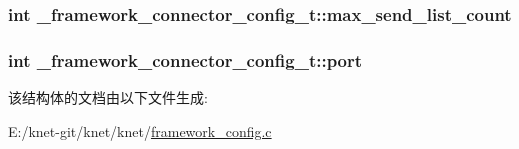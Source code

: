 \subsubsection[{max\+\_\+send\+\_\+list\+\_\+count}]{\setlength{\rightskip}{0pt plus 5cm}int \+\_\+framework\+\_\+connector\+\_\+config\+\_\+t\+::max\+\_\+send\+\_\+list\+\_\+count}\label{a00011_ac6e964a4a4ca24a176016275955a4e05_ac6e964a4a4ca24a176016275955a4e05}
\hypertarget{a00011_a5427527be42630baf3fc0497e74e4d4d_a5427527be42630baf3fc0497e74e4d4d}{}
\subsubsection[{port}]{\setlength{\rightskip}{0pt plus 5cm}int \+\_\+framework\+\_\+connector\+\_\+config\+\_\+t\+::port}\label{a00011_a5427527be42630baf3fc0497e74e4d4d_a5427527be42630baf3fc0497e74e4d4d}


该结构体的文档由以下文件生成\+:\begin{DoxyCompactItemize}
\item 
E\+:/knet-\/git/knet/knet/\hyperlink{a00055}{framework\+\_\+config.\+c}\end{DoxyCompactItemize}
